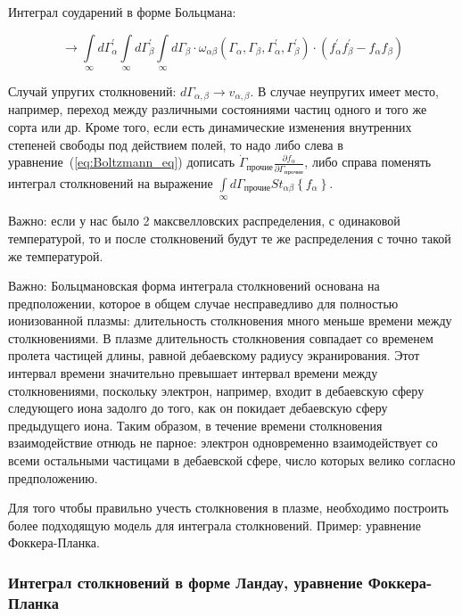 \documentclass[10pt, a4paper]{article}
\begin{document}
Интеграл соударений в форме Больцмана:

\begin{equation} \label{eq:Boltzmann_collision_term}
	\rightarrow \int\limits_{\infty}d\Gamma_\alpha^{'} \int\limits_{\infty}d\Gamma_\beta^{'} \int\limits_{\infty}d\Gamma_\beta \cdot \omega_{\alpha\beta}\left(\Gamma_\alpha, \Gamma_\beta, \Gamma_\alpha^{'}, \Gamma_\beta^{'}\right) \cdot (f_{\alpha}^{'}f_{\beta}^{'}-f_{\alpha}f_{\beta})
\end{equation}

Случай упругих столкновений: $d\Gamma_{\alpha, \beta}\rightarrow v_{\alpha, \beta}$. В случае неупругих имеет место, например, переход между различными состояниями частиц одного и того же сорта или др. Кроме того, если есть динамические изменения внутренних степеней свободы под действием полей, то надо либо слева в уравнение~(\eqref{eq:Boltzmann_eq}) дописать $\dot{\Gamma}_{\text{прочие}}\frac{\partial f_\alpha}{\partial \Gamma_{\text{прочие}}}$, либо справа поменять интеграл столкновений на выражение $\int\limits_{\infty}d\Gamma_{\text{прочие}}St_{\alpha\beta}\left\lbrace f_\alpha\right\rbrace$.

Важно: если у нас было 2 максвелловских распределения, с одинаковой температурой, то и после столкновений будут те же распределения с точно такой же температурой. 

Важно: Больцмановская форма интеграла столкновений основана на предположении, которое в общем случае несправедливо для полностью ионизованной плазмы: длительность столкновения много меньше времени между столкновениями. В плазме длительность столкновения совпадает со временем пролета частицей длины, равной дебаевскому радиусу экранирования. Этот интервал времени значительно превышает интервал времени между столкновениями, поскольку электрон, например, входит в дебаевскую сферу следующего иона задолго до того, как он покидает дебаевскую сферу предыдущего иона. Таким образом, в течение времени столкновения взаимодействие отнюдь не парное: электрон одновременно взаимодействует со всеми остальными частицами в дебаевской сфере, число которых велико согласно предположению.

Для того чтобы правильно учесть столкновения в плазме, необходимо построить более подходящую модель для интеграла столкновений. Пример: уравнение Фоккера-Планка.

\subsubsection{Интеграл столкновений в форме Ландау, уравнение Фоккера-Планка}
\end{document}
